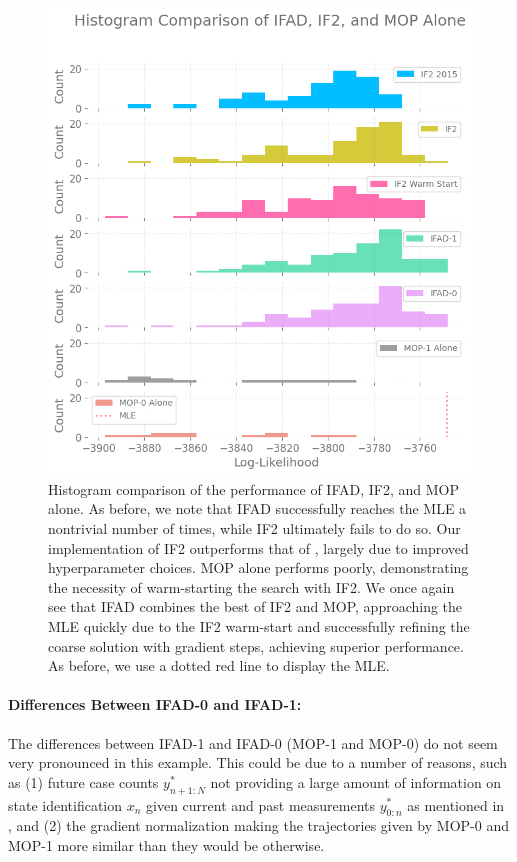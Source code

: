 \documentclass{article}
\begin{document}
\begin{figure}[u!]
    \centering
    \includegraphics[scale=0.7]{imgs/095/hist.png}
    \caption{Histogram comparison of the performance of IFAD, IF2, and MOP alone. As before, we note that IFAD successfully reaches the MLE a nontrivial number of times, while IF2 ultimately fails to do so. Our implementation of IF2 outperforms that of \cite{ionides15}, largely due to improved hyperparameter choices. MOP alone performs poorly, demonstrating the necessity of warm-starting the search with IF2. 
    We once again see that IFAD combines the best of IF2 and MOP, approaching the MLE quickly due to the IF2 warm-start and successfully refining the coarse solution with gradient steps, achieving superior performance. As before, we use a dotted red line to display the MLE. }
    \label{fig:hist-all}
\end{figure}


\paragraph{Differences Between IFAD-0 and IFAD-1:} The differences between IFAD-1 and IFAD-0 (MOP-1 and MOP-0) do not seem very pronounced in this example. This could be due to a number of reasons, such as (1) future case counts $y_{{n+1}:N}^*$ not providing a large amount of information on state identification $x_n$ given current and past measurements $y_{0:n}^*$ as mentioned in \cite{corenflos21}, and (2) the gradient normalization making the trajectories given by MOP-0 and MOP-1 more similar than they would be otherwise. 
\end{document}
